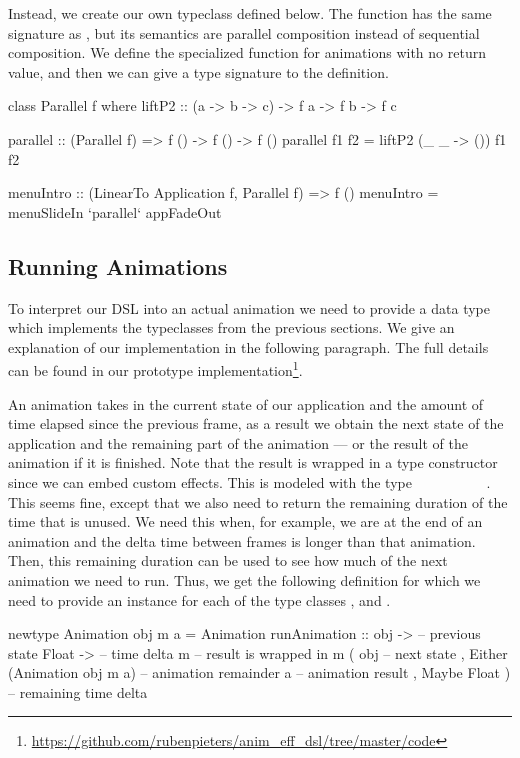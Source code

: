 Instead, we create our own  typeclass defined below. The function  has the same signature as , but its semantics are parallel composition instead of sequential composition. We define the specialized  function for animations with no return value, and then we can give a type signature to the  definition.

\begin{code}
class Parallel f where
  liftP2 :: (a -> b -> c) -> f a -> f b -> f c

parallel :: (Parallel f) => f () -> f () -> f ()
parallel f1 f2 = liftP2 (\_ _ -> ()) f1 f2

menuIntro :: (LinearTo Application f, Parallel f) => f ()
menuIntro = menuSlideIn `parallel` appFadeOut
\end{code}

\subsection{Running Animations}

To interpret our DSL into an actual animation we need to provide a data type which implements the typeclasses from the previous sections. We give an explanation of our implementation in the following paragraph. The full details can be found in our prototype implementation\footnote{\url{https://github.com/rubenpieters/anim_eff_dsl/tree/master/code}}.

An animation takes in the current state of our application and the amount of time elapsed since the previous frame, as a result we obtain the next state of the application and the remaining part of the animation --- or the result of the animation if it is finished. Note that the result is wrapped in a type constructor  since we can embed custom effects. This is modeled with the type ~\hs{->}~~\hs{->}~\hs{(}~~~~~~. This seems fine, except that we also need to return the remaining duration of the time that is unused. We need this when, for example, we are at the end of an animation and the delta time between frames is longer than that animation. Then, this remaining duration can be used to see how much of the next animation we need to run. Thus, we get the following definition for which we need to provide an instance for each of the type classes ,  and .

\begin{code}
newtype Animation obj m a = Animation { runAnimation ::
    obj ->                    -- previous state
    Float ->                  -- time delta
    m                         -- result is wrapped in m
      ( obj                   -- next state
      , Either
          (Animation obj m a) -- animation remainder
          a                   -- animation result
      , Maybe Float )}        -- remaining time delta
\end{code}

